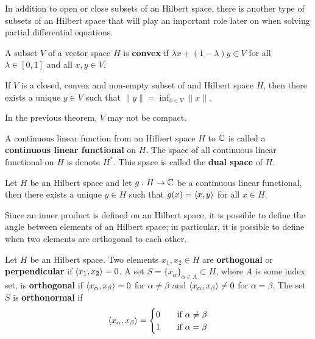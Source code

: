 In addition to open or close subsets of an Hilbert space, there is
another type of subsets of an Hilbert space that will play an
important role later on when solving partial differential equations.

\begin{defn}
A subset $V$ of a vector space $H$ is {\bfseries convex}
if $ \lambda x + (1-\lambda) y \in V$ for all $\lambda \in [0,1]$ and all
$x,y \in V$.    
\end{defn}

\begin{theorem} \label{fu_an_ccnes}
If $V$ is a closed, convex and non-empty subset of and Hilbert space
$H$, then there exists a unique $y \in V$ such that
$\displaystyle \|y\| = \inf_{x\in V} \|x\|$.
\end{theorem}

In the previous theorem, $V$ may not be compact.

\begin{defn} \label{defnCLFunctHilbert}
A continuous linear function from an Hilbert space $H$ to $\mathbb{C}$ is
called a {\bfseries continuous linear functional} on $H$.  The space of all continuous linear
functional on $H$ is denote $\displaystyle H^\ast$.  This space is
called the {\bfseries dual space} of $H$.
\end{defn}

\begin{theorem} \label{fu_an_RieszRT}
Let $H$ be an Hilbert space and let $g:H\rightarrow \mathbb{C}$ be a
continuous linear functional, then there exists a unique $y\in H$ such
that $g(x) = \left\langle{x} , {y}\right\rangle$ for all $x\in H$.  
\end{theorem}

Since an inner product is defined on an Hilbert space, it is possible
to define the angle between elements of an Hilbert space; in
particular, it is possible to define when two elements are orthogonal
to each other.

\begin{defn}
Let $H$ be an Hilbert space.  Two elements $x_1, x_2 \in H$ are
{\bfseries orthogonal} or
{\bfseries perpendicular} if $\left\langle{x_1} , {x_2}\right\rangle = 0$.
A set $\displaystyle S = \{ x_\alpha \}_{\alpha \in A} \subset H$,
where $A$ is some index set, is
{\bfseries orthogonal} if
$\left\langle{x_\alpha} , {x_\beta}\right\rangle = 0$ for $\alpha\neq\beta$ and
$\left\langle{x_\alpha} , {x_\beta}\right\rangle \neq 0$ for $\alpha=\beta$.  The set $S$ is
{\bfseries orthonormal} if
\[
\left\langle{x_\alpha} , {x_\beta}\right\rangle =
\begin{cases}
0 & \quad \text{if} \ \alpha \neq \beta \\
1 & \quad \text{if} \ \alpha = \beta \\
\end{cases}
\]
\end{defn}


